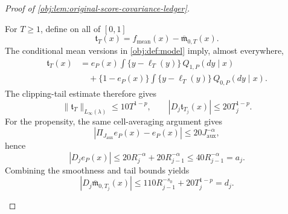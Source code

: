 \begin{proof}[Proof of \cref{obj:lem:original-score-covariance-ledger}]
\begin{enumerate}
For \(T\ge1\), define on all of \([0,1]\)
\[
\mathfrak t_T(x)
=
f_{\mathrm{mean}}(x)-\overline{\mathfrak m}_{0,T}(x).
\]
The conditional mean versions in \cref{obj:def:model} imply, almost everywhere,
\[
\begin{aligned}
\mathfrak t_T(x)
&=
e_P(x)\int\{y-\ell_T(y)\}\,Q_{1,P}(dy\mid x)\\
&\quad+
\{1-e_P(x)\}
\int\{y-\ell_T(y)\}\,Q_{0,P}(dy\mid x).
\end{aligned}
\]
The clipping-tail estimate therefore gives
\[
\|\mathfrak t_T\|_{L_\infty(\lambda)}
\le10T^{1-p},
\qquad
|D_j\mathfrak t_{T_j}(x)|
\le20T_j^{1-p}.
\]
For the propensity, the same cell-averaging argument gives
\[
|\Pi_{J_{\mathrm{aux}}}e_P(x)-e_P(x)|
\le20J_{\mathrm{aux}}^{-\alpha},
\]
hence
\[
|D_je_P(x)|
\le20R_j^{-\alpha}+20R_{j-1}^{-\alpha}
\le40R_{j-1}^{-\alpha}=a_j.
\]
Combining the smoothness and tail bounds yields
\[
|D_j\overline{\mathfrak m}_{0,T_j}(x)|
\le110R_{j-1}^{-s_0}+20T_j^{1-p}=d_j.
\]


\end{enumerate}
\end{proof}
